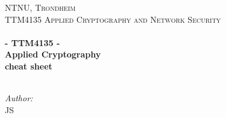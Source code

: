 
\begin{titlepage}
\vbox{ }

\vbox{ }

\begin{center}
\textsc{\Large NTNU, Trondheim}\\[0.5cm]
\textsc{\Large TTM4135 Applied Cryptography and Network Security}\\[0.5cm]


\vbox{ }
\HRule \\[0.4cm]
{ \huge \bfseries - TTM4135 -\\ Applied Cryptography \\cheat sheet\\[0.4cm]
\HRule \\[1.5cm]
}
\large

\emph{Author:}\\
JS

\vfill
\end{center}
\end{titlepage}